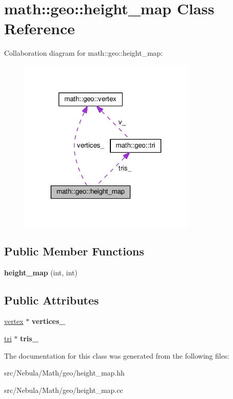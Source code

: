 \hypertarget{classmath_1_1geo_1_1height__map}{\section{math\-:\-:geo\-:\-:height\-\_\-map Class Reference}
\label{classmath_1_1geo_1_1height__map}
}


Collaboration diagram for math\-:\-:geo\-:\-:height\-\_\-map\-:
\nopagebreak
\begin{figure}[H]
\begin{center}
\leavevmode
\includegraphics[width=240pt]{classmath_1_1geo_1_1height__map__coll__graph}
\end{center}
\end{figure}
\subsection*{Public Member Functions}
\begin{DoxyCompactItemize}
\item 
\hypertarget{classmath_1_1geo_1_1height__map_a56685f77f9750167f419366039118113}{{\bfseries height\-\_\-map} (int, int)}\label{classmath_1_1geo_1_1height__map_a56685f77f9750167f419366039118113}

\end{DoxyCompactItemize}
\subsection*{Public Attributes}
\begin{DoxyCompactItemize}
\item 
\hypertarget{classmath_1_1geo_1_1height__map_add2b5f09f8bf6a3d7c674afd0fcb0ee4}{\hyperlink{classmath_1_1geo_1_1vertex}{vertex} $\ast$ {\bfseries vertices\-\_\-}}\label{classmath_1_1geo_1_1height__map_add2b5f09f8bf6a3d7c674afd0fcb0ee4}

\item 
\hypertarget{classmath_1_1geo_1_1height__map_a29abf1041ebd17777d88a2b55ef82535}{\hyperlink{classmath_1_1geo_1_1tri}{tri} $\ast$ {\bfseries tris\-\_\-}}\label{classmath_1_1geo_1_1height__map_a29abf1041ebd17777d88a2b55ef82535}

\end{DoxyCompactItemize}


The documentation for this class was generated from the following files\-:\begin{DoxyCompactItemize}
\item 
src/\-Nebula/\-Math/geo/height\-\_\-map.\-hh\item 
src/\-Nebula/\-Math/geo/height\-\_\-map.\-cc\end{DoxyCompactItemize}
